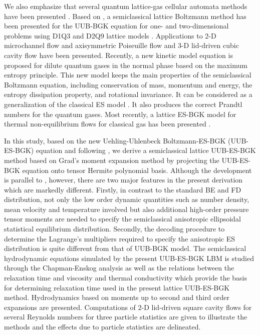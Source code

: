 \documentclass[doublecol]{epl2}
\begin{document}
We also emphasize that several quantum lattice-gas cellular automata methods have been presented \cite{Meyer1996, Boghosian98, Yepez2001, Palpacelli}.
Based on \cite{Shan2006}, a semiclassical lattice Boltzmann method has been presented for the UUB-BGK equation for one- and two-dimensional problems using D1Q3 and D2Q9 lattice models \cite{Yang2009}.  Applications to 2-D microchannel flow and axisymmetric Poiseuille flow and 3-D lid-driven cubic cavity flow have been presented.  Recently, a new kinetic model equation is proposed \cite{Wu2012} for dilute quantum gases in the normal phase based on the maximum entropy principle. This new model keeps the main properties of the semiclassical Boltzmann equation, including conservation of mass, momentum and energy, the entropy dissipation property, and rotational invariance. It can be considered as a generalization of the classical ES model \cite{Holway1966}. It also produces the correct Prandtl numbers for the quantum gases.  Most recently, a lattice ES-BGK model for thermal non-equilibrium flows for classical gas has been presented \cite{Zhang2013}.

In this study, based on the new Uehling-Uhlenbeck Boltzmann-ES-BGK (UUB-ES-BGK) equation \cite{Wu2012} and following \cite{Yang2009}, we
derive a semiclassical lattice UUB-ES-BGK method based on Grad's moment expansion method by projecting the UUB-ES-BGK equation onto tensor Hermite polynomial basis.  Although the development is parallel to \cite{Yang2009}, however, there are two major features in the present derivation which are markedly different. Firstly, in contrast to the standard BE and FD distribution, not only the low order dynamic quantities such as number density, mean velocity and temperature involved but also additional high-order pressure tensor moments are needed to specify the semiclassical anisotropic ellipsoidal statistical equilibrium distribution.  Secondly, the decoding procedure to determine the Lagrange's multipliers required to specify the anisotropic ES distribution is quite different from that of UUB-BGK model.  The semiclassical hydrodynamic equations simulated by the present UUB-ES-BGK LBM is studied through the Chapman-Enskog analysis as well as the relations between the relaxation time and viscosity and thermal conductivity which provide the basis for determining relaxation time used in the present lattice UUB-ES-BGK method.  Hydrodynamics based on moments up to second and third order expansions are presented.   Computations of 2-D lid-driven square cavity flows for several Reynolds numbers for three particle statistics are given to illustrate the methods and the effects due to particle statistics are delineated.
\end{document}
